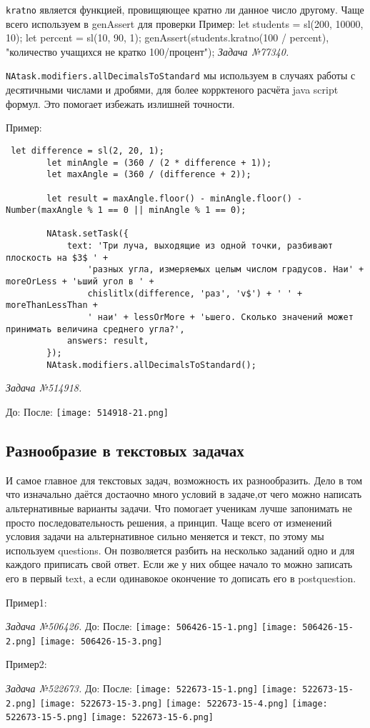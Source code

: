 \texttt{kratno} является функцией, провищяющее кратно ли данное число другому. Чаще всего используем в genAssert для проверки
Пример:
let students = sl(200, 10000, 10);
let percent = sl(10, 90, 1);
genAssert(students.kratno(100 / percent), "количество учащихся не кратко 100/процент");
\textsl{Задача №77340.}

\texttt{NAtask.modifiers.allDecimalsToStandard} мы используем в случаях работы с десятичными числами и дробями, для более коррктеного расчёта java script формул.
 Это помогает избежать излишней точности.

Пример:
\begin{lstlisting}
 let difference = sl(2, 20, 1);
        let minAngle = (360 / (2 * difference + 1));
        let maxAngle = (360 / (difference + 2));

        let result = maxAngle.floor() - minAngle.floor() - Number(maxAngle % 1 == 0 || minAngle % 1 == 0);

        NAtask.setTask({
            text: 'Три луча, выходящие из одной точки, разбивают плоскость на $3$ ' +
                'разных угла, измеряемых целым числом градусов. Наи' + moreOrLess + 'ьший угол в ' +
                chislitlx(difference, 'раз', 'v$') + ' ' + moreThanLessThan +
                ' наи' + lessOrMore + 'ьшего. Сколько значений может принимать величина среднего угла?',
            answers: result,
        });
        NAtask.modifiers.allDecimalsToStandard();
\end{lstlisting}       
\textsl{Задача №514918.}


До:
После:
\texttt{[image: 514918-21.png]}

\subsection{Разнообразие в текстовых задачах}
И самое главное для текстовых задач, возможность их разнообразить. Дело в том что изначально даётся достаочно много условий в задаче,от чего можно написать альтернативные варианты задачи. Что помогает ученикам лучше запонимать не просто последовательность решения, а принцип.
Чаще всего от изменений условия задачи на альтернативное сильно меняется и текст, по этому мы используем questions. Он позволяется разбить на несколько заданий одно и для каждого приписать свой ответ. Если же у них общее начало то можно записать его в первый text, а если одинавокое окончение то 
дописать его в postquestion.

Пример1: 
 
\textsl{Задача №506426.}
До:
После:
\texttt{[image: 506426-15-1.png]}
\texttt{[image: 506426-15-2.png]}
\texttt{[image: 506426-15-3.png]}

Пример2:
 
\textsl{Задача №522673.}
До:
После:
\texttt{[image: 522673-15-1.png]}
\texttt{[image: 522673-15-2.png]}
\texttt{[image: 522673-15-3.png]}
\texttt{[image: 522673-15-4.png]}
\texttt{[image: 522673-15-5.png]}
\texttt{[image: 522673-15-6.png]}